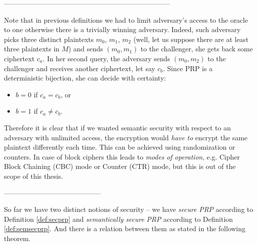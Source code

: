 ------------------------------------------------------------------------
\begin{note}
	Note that in previous definitions we had to limit adversary's access to the oracle to one otherwise there is a trivially winning adversary. Indeed, such adversary picks three distinct plaintexts $m_0$, $m_1$, $m_2$ (well, let us suppose there are at least three plaintexts in $M$) and sends $(m_0,m_1)$ to the challenger, she gets back some ciphertext $c_a$. In her second query, the adversary sends $(m_0,m_2)$ to the challenger and receives another ciphertext, let say $c_b$. Since PRP is a deterministic bijection, she can decide with certainty:
	\begin{itemize}
		\item $b=0$ if $c_a = c_b$, or
		\item $b=1$ if $c_a \neq c_b$.
	\end{itemize}
	
	Therefore it is clear that if we wanted semantic security with respect to an adversary with unlimited access, the encryption would {\em have to} encrypt the same plaintext differently each time. This can be achieved using randomization or counters. In case of block ciphers this leads to {\em modes of operation}, e.g. Cipher Block Chaining (CBC) mode or Counter (CTR) mode, but this is out of the scope of this thesis.
\end{note}
------------------------------------------

So far we have two distinct notions of security -- we have {\em secure PRP} according to Definition \ref{def:secprp} and {\em semantically secure PRP} according to Definition \ref{def:semsecprp}. And there is a relation between them as stated in the following theorem.

